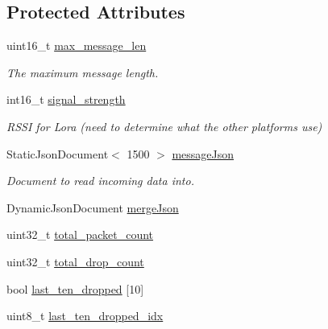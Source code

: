 \subsection*{Protected Attributes}
\begin{DoxyCompactItemize}
\item 
uint16\+\_\+t \hyperlink{class_loom_comm_plat_a2b4f69c2ec15028f5f281c3d1d399dba}{max\+\_\+message\+\_\+len}
\begin{DoxyCompactList}\small\item\em The maximum message length. \end{DoxyCompactList}\item 
int16\+\_\+t \hyperlink{class_loom_comm_plat_a20b6f639d308b8b2f05cea41597bd6d3}{signal\+\_\+strength}
\begin{DoxyCompactList}\small\item\em R\+S\+SI for Lora (need to determine what the other platforms use) \end{DoxyCompactList}\item 
Static\+Json\+Document$<$ 1500 $>$ \hyperlink{class_loom_comm_plat_a065bda8c5f83a087359bda645b51c87e}{message\+Json}
\begin{DoxyCompactList}\small\item\em Document to read incoming data into. \end{DoxyCompactList}\item 
Dynamic\+Json\+Document \hyperlink{class_loom_comm_plat_a9dbf2f13eafb03ae9078e10af47ca8cf}{merge\+Json}
\item 
uint32\+\_\+t \hyperlink{class_loom_comm_plat_afacaa3247078d09dd953371cfb929094}{total\+\_\+packet\+\_\+count}
\item 
uint32\+\_\+t \hyperlink{class_loom_comm_plat_a731d3f9f16e8a2647f0ef81e477ef2a7}{total\+\_\+drop\+\_\+count}
\item 
bool \hyperlink{class_loom_comm_plat_a447e99f2f727936f4aff95257ca98b62}{last\+\_\+ten\+\_\+dropped} \mbox{[}10\mbox{]}
\item 
uint8\+\_\+t \hyperlink{class_loom_comm_plat_a790dbad03d48713072716c23d515c6c0}{last\+\_\+ten\+\_\+dropped\+\_\+idx}
\end{DoxyCompactItemize}
